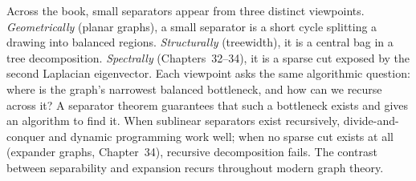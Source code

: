\begin{aestheticbox}
Across the book, small separators appear from three distinct viewpoints. \emph{Geometrically} (planar graphs), a small separator is a short cycle splitting a drawing into balanced regions. \emph{Structurally} (treewidth), it is a central bag in a tree decomposition. \emph{Spectrally} (Chapters~32--34), it is a sparse cut exposed by the second Laplacian eigenvector. Each viewpoint asks the same algorithmic question: where is the graph's narrowest balanced bottleneck, and how can we recurse across it? A separator theorem guarantees that such a bottleneck exists and gives an algorithm to find it. When sublinear separators exist recursively, divide-and-conquer and dynamic programming work well; when no sparse cut exists at all (expander graphs, Chapter~34), recursive decomposition fails. The contrast between separability and expansion recurs throughout modern graph theory.
\end{aestheticbox}

